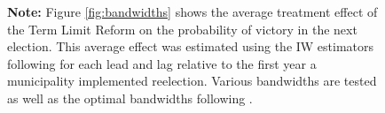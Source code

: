 \documentclass[12pt]{amsart}
\numberwithin{equation}{section}
\theoremstyle{definition}
\theoremstyle{definition}
\theoremstyle{definition}
\begin{document}
\begin{appendix}
\begin{figure}[h]
 \textbf{Note:} Figure \ref{fig:bandwidths} shows the average treatment effect of the Term Limit Reform on the probability of victory in the next election. This average effect was estimated using the IW estimators following \citet{abraham_sun_2020} for each lead and lag relative to the first year a municipality implemented reelection. Various bandwidths are tested as well as the optimal bandwidths following \citet{calonicoetal_2014}. 
   
\end{figure} 

\end{appendix}
\end{document}
